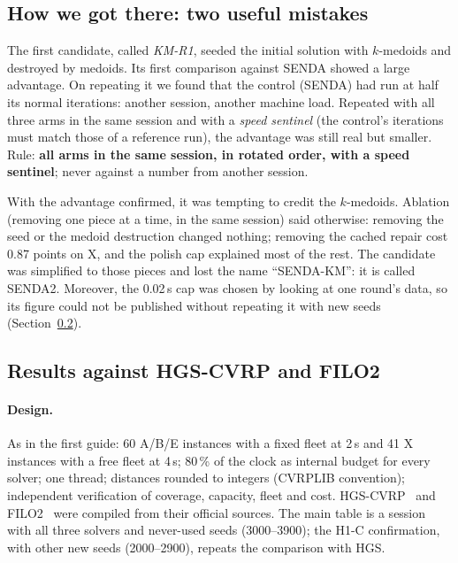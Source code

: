 \documentclass[11pt,a4paper]{article}
\newcommand{\senda}{SENDA}
\newcommand{\sendados}{SENDA2}
\begin{document}
\subsection{How we got there: two useful mistakes}

\begin{leccion}
The first candidate, called \emph{KM-R1}, seeded the initial solution with $k$-medoids and destroyed by
medoids. Its first comparison against \senda{} showed a large advantage. On repeating it we found that
the control (\senda) had run at half its normal iterations: another session, another machine load.
Repeated with all three arms in the same session and with a \emph{speed sentinel} (the control's
iterations must match those of a reference run), the advantage was still real but smaller. Rule:
\textbf{all arms in the same session, in rotated order, with a speed sentinel}; never against a number
from another session.
\end{leccion}

\begin{leccion}
With the advantage confirmed, it was tempting to credit the $k$-medoids. Ablation (removing one piece
at a time, in the same session) said otherwise: removing the seed or the medoid destruction changed
nothing; removing the cached repair cost 0.87 points on X, and the polish cap explained most of the
rest. The candidate was simplified to those pieces and lost the name ``SENDA-KM'': it is called
\sendados. Moreover, the 0.02\,s cap was chosen by looking at one round's data, so its figure could not
be published without repeating it with new seeds (Section~\ref{sec:confirmacion}).
\end{leccion}

\subsection{Results against HGS-CVRP and FILO2}
\label{sec:confirmacion}

\paragraph{Design.} As in the first guide: 60 A/B/E instances with a fixed fleet at 2\,s and 41 X
instances with a free fleet at 4\,s; 80\,\% of the clock as internal budget for every solver; one
thread; distances rounded to integers (CVRPLIB convention); independent verification of coverage,
capacity, fleet and cost. HGS-CVRP~\cite{vidal2022hgs} and FILO2~\cite{accorsi2023} were compiled from
their official sources. The main table is a session with all three solvers and never-used seeds
(3000--3900); the H1-C confirmation, with other new seeds (2000--2900), repeats the comparison with
HGS.
\end{document}
